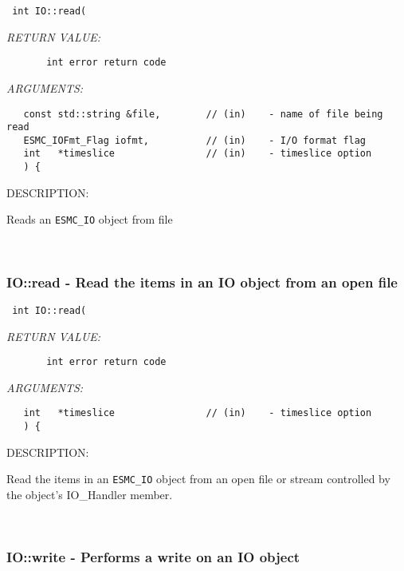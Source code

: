   
\begin{verbatim} int IO::read(\end{verbatim}{\em RETURN VALUE:}
\begin{verbatim}       int error return code\end{verbatim}{\em ARGUMENTS:}
\begin{verbatim} 
   const std::string &file,        // (in)    - name of file being read
   ESMC_IOFmt_Flag iofmt,          // (in)    - I/O format flag
   int   *timeslice                // (in)    - timeslice option
   ) {\end{verbatim}
{\sf DESCRIPTION:\\ }


        Reads an {\tt ESMC\_IO} object from file
   
 
\mbox{}\hrulefill\ 
 
\subsubsection [IO::read] {IO::read - Read the items in an IO object from an open file}


  
\begin{verbatim} int IO::read(\end{verbatim}{\em RETURN VALUE:}
\begin{verbatim}       int error return code\end{verbatim}{\em ARGUMENTS:}
\begin{verbatim} 
   int   *timeslice                // (in)    - timeslice option
   ) {\end{verbatim}
{\sf DESCRIPTION:\\ }


        Read the items in an {\tt ESMC\_IO} object from an open file or stream
        controlled by the object's IO_Handler member.
   
 
\mbox{}\hrulefill\ 
 
\subsubsection [IO::write] {IO::write - Performs a write on an IO object}


